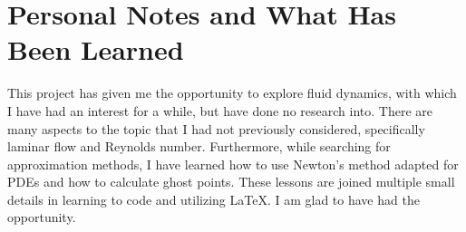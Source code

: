 \documentclass{article}
\begin{document}
\section{Personal Notes and What Has Been Learned}
This project has given me the opportunity to explore fluid dynamics, with which I have had an interest for a while, but have done no research into. There are many aspects to the topic that I had not previously considered, specifically laminar flow and Reynolds number. Furthermore, while searching for approximation methods, I have learned how to use Newton's method adapted for PDEs and how to calculate ghost points. These lessons are joined multiple small details in learning to code and utilizing LaTeX. I am glad to have had the opportunity.
\end{document}
